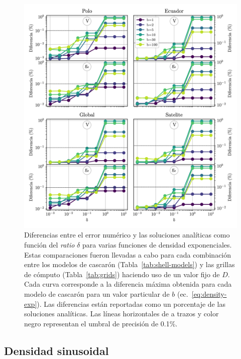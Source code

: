 \begin{figure}
\centering
\includegraphics[width=\linewidth]{figs/tesseroids-variable-density/exponential-density-diffs.png}
\caption{
    Diferencias entre el error numérico y las soluciones analíticas como
    función del \emph{ratio} $\delta$ para varias funciones de densidad
    exponenciales.
    Estas comparaciones fueron llevadas a cabo para cada combinación entre los
    modelos de cascarón (Tabla~\ref{tab:shell-models}) y las grillas de cómputo
    (Tabla~\ref{tab:grids}) haciendo uso de un valor fijo de $D$. Cada curva
    corresponde a la diferencia máxima obtenida para cada modelo de cascarón
    para un valor particular de $b$ (ec.~\ref{eq:density-exp}). Las diferencias
    están reportadas como un porcentaje de las soluciones analíticas. Las
    líneas horizontales de a trazos y color negro representan el umbral de
    precisión de 0.1\%.
    }
\label{fig:delta-exponential}
\end{figure}


\subsection{Densidad sinusoidal}

